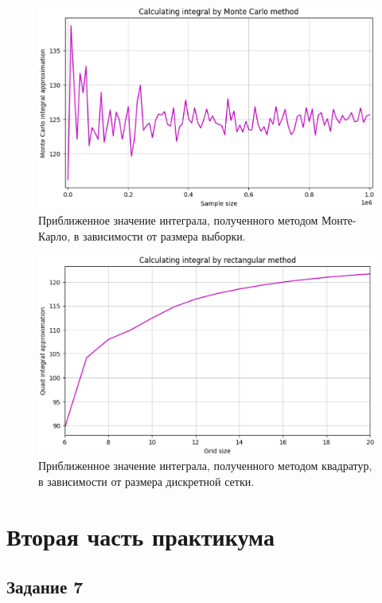 \documentclass[11pt]{report}
\begin{document}
\begin{figure}[H]
    \centering
    \includegraphics[width=0.9\linewidth]{images/integ-monte-carlo.eps}
    \caption{Приближенное значение интеграла, полученного методом Монте-Карло, в зависимости от размера выборки.}
    \label{fig:integ-monte-carlo}
\end{figure}

\begin{figure}[H]
    \centering
    \includegraphics[width=0.9\linewidth]{images/integ-rectangular.eps}
    \caption{Приближенное значение интеграла, полученного методом квадратур, в зависимости от размера дискретной сетки.}
    \label{fig:integ-rectangular}
\end{figure}

\chapter{Вторая часть практикума}

\section{Задание 7}
\end{document}
